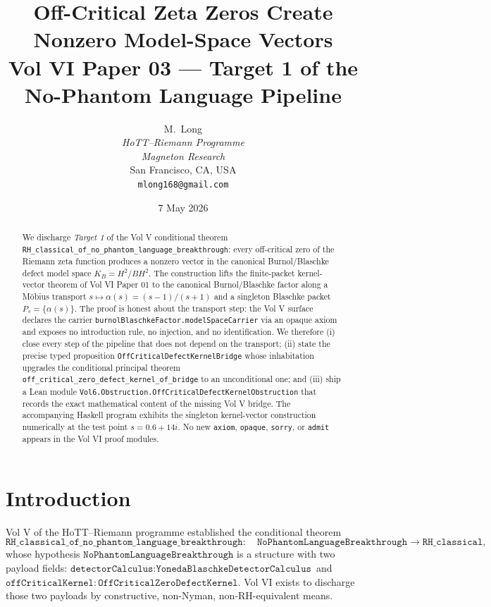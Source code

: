 \documentclass[12pt]{article}
\title{Off-Critical Zeta Zeros Create Nonzero Model-Space Vectors\\[2pt]
\large{Vol VI Paper 03 --- Target 1 of the No-Phantom Language Pipeline}}
\author{M.\ Long \\
\textit{HoTT--Riemann Programme} \\
\textit{Magneton Research} \\
San Francisco, CA, USA \\
\texttt{mlong168@gmail.com}}
\date{7 May 2026}
\theoremstyle{definition}
\theoremstyle{remark}
\newcommand{\BurnolFactor}{B}
\begin{document}
\maketitle

\begin{abstract}
We discharge \emph{Target 1} of the Vol V conditional theorem
\texttt{RH\_classical\_of\_no\_phantom\_language\_breakthrough}: every
off-critical zero of the Riemann zeta function produces a nonzero vector in
the canonical Burnol/Blaschke defect model space
$K_{B} = H^{2}/\BurnolFactor H^{2}$. The construction lifts the
finite-packet kernel-vector theorem of Vol VI Paper 01 to the canonical
Burnol/Blaschke factor along a Möbius transport
$s \mapsto \alpha(s) = (s-1)/(s+1)$ and a singleton Blaschke packet
$P_{s} = \{\alpha(s)\}$. The proof is honest about the transport step: the
Vol V surface declares the carrier
\texttt{burnolBlaschkeFactor.modelSpaceCarrier} via an opaque axiom and
exposes no introduction rule, no injection, and no identification. We
therefore (i) close every step of the pipeline that does not depend on the
transport; (ii) state the precise typed proposition
\texttt{OffCriticalDefectKernelBridge} whose inhabitation upgrades the
conditional principal theorem
\texttt{off\_critical\_zero\_defect\_kernel\_of\_bridge} to an unconditional
one; and (iii) ship a Lean module
\texttt{Vol6.Obstruction.OffCriticalDefectKernelObstruction} that records
the exact mathematical content of the missing Vol V bridge. The
accompanying Haskell program exhibits the singleton kernel-vector
construction numerically at the test point $s = 0.6 + 14i$. No new
\texttt{axiom}, \texttt{opaque}, \texttt{sorry}, or \texttt{admit}
appears in the Vol VI proof modules.
\end{abstract}

\tableofcontents

\section{Introduction}\label{sec:intro}

Vol V of the HoTT--Riemann programme established the conditional theorem
\begin{equation}\label{eq:master}
\texttt{RH\_classical\_of\_no\_phantom\_language\_breakthrough}
:\quad \texttt{NoPhantomLanguageBreakthrough} \to \texttt{RH\_classical},
\end{equation}
whose hypothesis
\(
\texttt{NoPhantomLanguageBreakthrough}
\)
is a structure with two payload fields:
\(
\texttt{detectorCalculus} : \texttt{YonedaBlaschkeDetectorCalculus}
\)
and
\(
\texttt{offCriticalKernel} : \texttt{OffCriticalZeroDefectKernel}.
\)
Vol VI exists to discharge those two payloads by constructive,
non-Nyman, non-RH-equivalent means.
\end{document}

